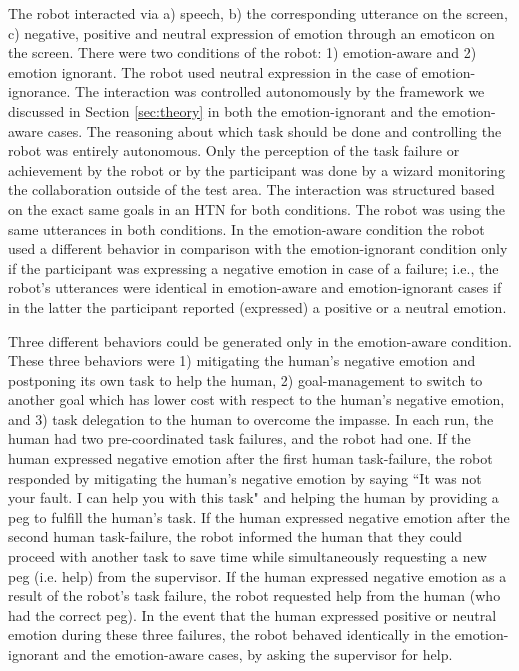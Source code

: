 \documentclass{sig-alternate-05-2015}
\begin{document}
The robot interacted via a) speech, b) the corresponding utterance on the
screen, c) negative, positive and neutral expression of emotion through an
emoticon on the screen. There were two conditions of the robot: 1)
emotion-aware and 2) emotion ignorant. The robot used neutral expression in the
case of emotion-ignorance. The interaction was controlled autonomously by the
framework we discussed in Section \ref{sec:theory} in both the emotion-ignorant
and the emotion-aware cases. The reasoning about which task should be done and
controlling the robot was entirely autonomous. Only the perception of the task
failure or achievement by the robot or by the participant was done by a wizard
monitoring the collaboration outside of the test area. The interaction was
structured based on the exact same goals in an HTN for both conditions. The
robot was using the same utterances in both conditions. In the emotion-aware
condition the robot used a different behavior in comparison with the
emotion-ignorant condition only if the participant was expressing a negative
emotion in case of a failure; i.e., the robot's utterances were identical in
emotion-aware and emotion-ignorant cases if in the latter the participant
reported (expressed) a positive or a neutral emotion.

Three different behaviors could be generated only in the emotion-aware
condition. These three behaviors were 1) mitigating the human's negative emotion
and postponing its own task to help the human, 2) goal-management to switch to
another goal which has lower cost with respect to the human's negative emotion,
and 3) task delegation to the human to overcome the impasse. In each run, the
human had two pre-coordinated task failures, and the robot had one. If the human
expressed negative emotion after the first human task-failure, the robot
responded by mitigating the human's negative emotion by saying  ``It was not
your fault. I can help you with this task" and helping the human by providing a
peg to fulfill the human's task. If the human expressed negative emotion after
the second human task-failure, the robot informed the human that they could
proceed with another task to save time while simultaneously requesting a new peg
(i.e. help) from the supervisor. If the human expressed negative emotion as a
result of the robot's task failure, the robot requested help from the human (who
had the correct peg). In the event that the human expressed positive or neutral
emotion during these three failures, the robot behaved identically in the
emotion-ignorant and the emotion-aware cases, by asking the supervisor for help. 
\end{document}
